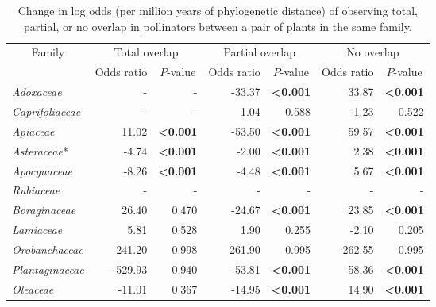 \documentclass[12pt]{article}
\begin{document}
  \begin{table}[!h]
  \caption{\small Change in log odds (per million years of phylogenetic distance) of observing total, partial, or no overlap in pollinators between a pair of plants in the same family.}
  \small
  \label{family_slopes_pp}
  \begin{tabular}{|l  rrr rrr|}
  \hline
  \multicolumn{1}{|c}{\multirow{2}{*}{Family}}
  & \multicolumn{2}{|c}{Total overlap} & \multicolumn{2}{|c}{Partial overlap} & \multicolumn{2}{|c|}{No overlap} \\
  \cline{2-7}
   & \multicolumn{1}{|c}{Odds ratio} & \multicolumn{1}{|c}{$P$-value} & \multicolumn{1}{|c}{Odds ratio} & \multicolumn{1}{|c}{$P$-value} & \multicolumn{1}{|c}{Odds ratio} & \multicolumn{1}{|c|}{$P$-value} \\
    \hline
    \emph{Adoxaceae}        &   -    & -                       &  -33.37 & \textbf{\textless0.001} &  33.87 & \textbf{\textless0.001} \\
    \emph{Caprifoliaceae}   &   -    & -                       &    1.04 & 0.588                   &  -1.23 & 0.522 \\
    \emph{Apiaceae}         &  11.02 & \textbf{\textless0.001} &  -53.50 & \textbf{\textless0.001} &  59.57 & \textbf{\textless0.001} \\ 
    \emph{Asteraceae}*      &  -4.74 & \textbf{\textless0.001} &   -2.00 & \textbf{\textless0.001} &   2.38 & \textbf{\textless0.001} \\
    \emph{Apocynaceae}      &  -8.26 & \textbf{\textless0.001} &   -4.48 & \textbf{\textless0.001} &   5.67 & \textbf{\textless0.001} \\
    \emph{Rubiaceae}        & - & - & - & - & - & - \\
    \emph{Boraginaceae}     &  26.40 & 0.470                   &  -24.67 & \textbf{\textless0.001} &  23.85 & \textbf{\textless0.001} \\
    \emph{Lamiaceae}        &   5.81 & 0.528                   &    1.90 & 0.255                   &  -2.10 & 0.205 \\
    \emph{Orobanchaceae}    & 241.20 & 0.998                   &  261.90 & 0.995                   &-262.55 & 0.995 \\
    \emph{Plantaginaceae}   &-529.93 & 0.940                   &  -53.81 & \textbf{\textless0.001} &  58.36 & \textbf{\textless0.001} \\
    \emph{Oleaceae}         & -11.01 & 0.367                   &  -14.95 & \textbf{\textless0.001} &  14.90 & \textbf{\textless0.001} \\

\end{tabular}
\end{table}
\end{document}
